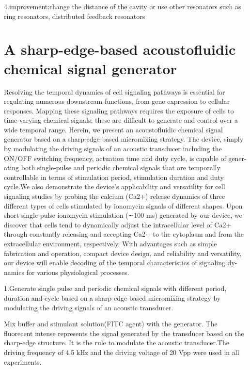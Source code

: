 \documentclass{article}
\begin{document}
4.improvement:change the distance of the cavity or use other resonators such as ring resonators, distributed feedback resonators


\part{A sharp-edge-based acoustofluidic chemical signal generator}

Resolving the temporal dynamics of cell signaling pathways is essential for regulating numerous downstream functions, from gene expression to cellular responses. Mapping these signaling pathways requires the exposure of cells to time-varying chemical signals; these are difficult to generate and control over a wide temporal range. Herein, we present an acoustofluidic chemical signal generator based on a sharp-edge-based micromixing strategy. The device, simply by modulating the driving signals of an acoustic transducer including the ON/OFF switching frequency, actuation time and duty cycle, is capable of gener- ating both single-pulse and periodic chemical signals that are temporally controllable in terms of stimulation period, stimulation duration and duty cycle.We also demonstrate the device's applicability and versatility for cell signaling studies by probing the calcium (Ca2+) release dynamics of three different types of cells stimulated by ionomycin signals of different shapes. Upon short single-pulse ionomycin stimulation (∼100 ms) generated by our device, we discover that cells tend to dynamically adjust the intracellular level of Ca2+ through constantly releasing and accepting Ca2+ to the cytoplasm and from the extracellular environment, respectively. With advantages such as simple fabrication and operation, compact device design, and reliability and versatility, our device will enable decoding of the temporal characteristics of signaling dy- namics for various physiological processes.


1.Generate single pulse and periodic chemical signals with different period, duration and cycle  based on a sharp-edge-based micromixing strategy by modulating the driving signals of an acoustic transducer.


Mix buffer and stimulant solution(FITC agent) with the generator. The fluorecent intense represents the signal generated by the transducer based on the sharp-edge structure. It is the rule to modulate the acoustic transducer.The driving frequency of 4.5 kHz and the driving voltage of 20 Vpp were used in all experiments.
\end{document}

